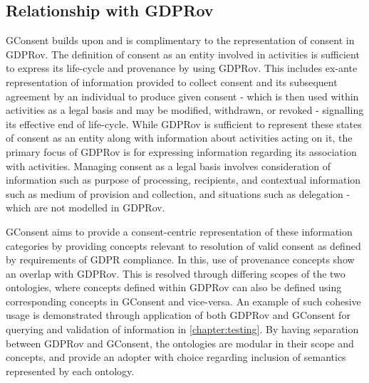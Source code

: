 \subsection{Relationship with GDPRov}
GConsent builds upon and is complimentary to the representation of consent in GDPRov.
The definition of consent as an entity involved in activities is sufficient to express its life-cycle and provenance by using GDPRov. This includes ex-ante representation of information provided to collect consent and its subsequent agreement by an individual to produce given consent - which is then used within activities as a legal basis and may be modified, withdrawn, or revoked - signalling its effective end of life-cycle.
While GDPRov is sufficient to represent these states of consent as an entity along with information about activities acting on it, the primary focus of GDPRov is for expressing information regarding its association with activities.
Managing consent as a legal basis involves consideration of information such as purpose of processing, recipients, and contextual information such as medium of provision and collection, and situations such as delegation - which are not modelled in GDPRov.

GConsent aims to provide a consent-centric representation of these information categories by providing concepts relevant to resolution of valid consent as defined by requirements of GDPR compliance. In this, use of provenance concepts show an overlap with GDPRov.
This is resolved through differing scopes of the two ontologies, where concepts defined within GDPRov can also be defined using corresponding concepts in GConsent and vice-versa. An example of such cohesive usage is demonstrated through application of both GDPRov and GConsent for querying and validation of information in \autoref{chapter:testing}.
By having separation between GDPRov and GConsent, the ontologies are modular in their scope and concepts, and provide an adopter with choice regarding inclusion of semantics represented by each ontology.

